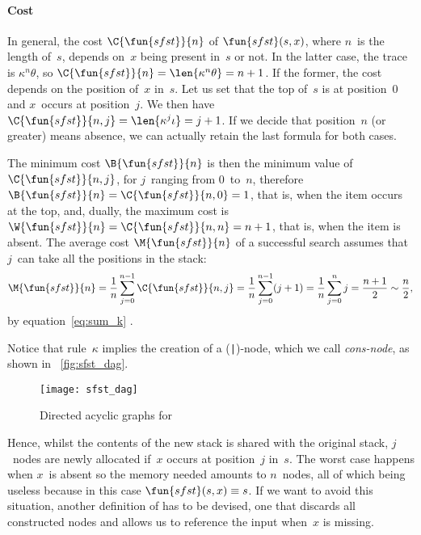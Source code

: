 \paragraph{Cost}

In general, the cost
\(\C{\fun{sfst}}{n}\) of
\(\fun{sfst}(s,x)\), where \(n\)~is the length of~\(s\), depends
on~\(x\) being present in~\(s\) or not. In the latter case, the trace
is \(\kappa^n\theta\), so \(\C{\fun{sfst}}{n} = \len{\kappa^n\theta} =
n + 1\). If the former, the cost depends on the position of~\(x\)
in~\(s\). Let us set that the top of~\(s\) is at position~\(0\) and
\(x\)~occurs at position~\(j\). We then have \(\C{\fun{sfst}}{n,j} =
\len{\kappa^j\iota} = j + 1\). If we
decide that position~\(n\) (or greater) means absence, we can actually
retain the last formula for both cases.

The minimum cost \(\B{\fun{sfst}}{n}\)
is then the minimum value
of \(\C{\fun{sfst}}{n,j}\), for \(j\)~ranging from \(0\)~to~\(n\),
therefore \(\B{\fun{sfst}}{n} = \C{\fun{sfst}}{n,0} = 1\), that is,
when the item occurs at the top, and, dually, the maximum
cost
is \(\W{\fun{sfst}}{n} =
\C{\fun{sfst}}{n,n} = n + 1\), that is, when the item is absent. The
average cost
\(\M{\fun{sfst}}{n}\) of a successful search assumes that \(j\)~can
take all the positions in the stack:
\begin{equation*}
  \M{\fun{sfst}}{n} = \frac{1}{n}\sum_{j=0}^{n-1}\C{\fun{sfst}}{n,j} =
  \frac{1}{n}\sum_{j=0}^{n-1}(j+1) = \frac{1}{n}\sum_{j=0}^{n}j
  = \frac{n+1}{2} \sim \frac{n}{2},
\end{equation*}
by equation~\eqref{eq:sum_k} .

Notice that rule~\(\kappa\) implies the creation of a
(\texttt{|})\hyp{}node, which we call
\emph{cons\hyp{}node}, as shown in
\fig~\vref{fig:sfst_dag}.
\begin{figure}
\centering
\texttt{[image: sfst\_dag]}
\caption{Directed acyclic graphs for }
\label{fig:sfst_dag}
\end{figure}
Hence, whilst the contents of the new stack is shared with the
original stack, \(j\)~nodes are newly allocated if~\(x\) occurs at
position~\(j\) in~\(s\). The worst case happens when \(x\)~is absent
so the memory needed amounts to
\(n\)~nodes, all of which being useless because in this case
\(\fun{sfst}(s,x) \equiv s\). If we want to avoid this situation,
another definition of  has to be devised, one that
discards all constructed nodes and allows us to reference the input
when~\(x\) is missing.

